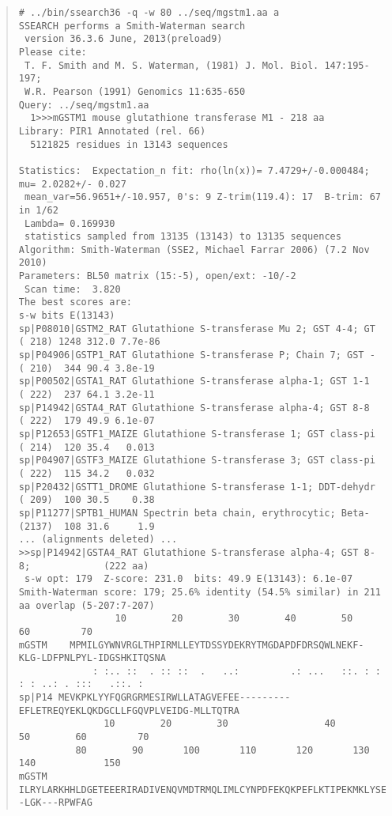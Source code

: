 \begin{footnotesize}
\begin{quote}
\begin{verbatim}
# ../bin/ssearch36 -q -w 80 ../seq/mgstm1.aa a
SSEARCH performs a Smith-Waterman search
 version 36.3.6 June, 2013(preload9)
Please cite:
 T. F. Smith and M. S. Waterman, (1981) J. Mol. Biol. 147:195-197; 
 W.R. Pearson (1991) Genomics 11:635-650
Query: ../seq/mgstm1.aa
  1>>>mGSTM1 mouse glutathione transferase M1 - 218 aa
Library: PIR1 Annotated (rel. 66) 
  5121825 residues in 13143 sequences

Statistics:  Expectation_n fit: rho(ln(x))= 7.4729+/-0.000484; mu= 2.0282+/- 0.027
 mean_var=56.9651+/-10.957, 0's: 9 Z-trim(119.4): 17  B-trim: 67 in 1/62
 Lambda= 0.169930
 statistics sampled from 13135 (13143) to 13135 sequences
Algorithm: Smith-Waterman (SSE2, Michael Farrar 2006) (7.2 Nov 2010)
Parameters: BL50 matrix (15:-5), open/ext: -10/-2
 Scan time:  3.820
The best scores are:                                                    s-w bits E(13143)
sp|P08010|GSTM2_RAT Glutathione S-transferase Mu 2; GST 4-4; GT  ( 218) 1248 312.0 7.7e-86
sp|P04906|GSTP1_RAT Glutathione S-transferase P; Chain 7; GST -  ( 210)  344 90.4 3.8e-19
sp|P00502|GSTA1_RAT Glutathione S-transferase alpha-1; GST 1-1   ( 222)  237 64.1 3.2e-11
sp|P14942|GSTA4_RAT Glutathione S-transferase alpha-4; GST 8-8   ( 222)  179 49.9 6.1e-07
sp|P12653|GSTF1_MAIZE Glutathione S-transferase 1; GST class-pi  ( 214)  120 35.4   0.013
sp|P04907|GSTF3_MAIZE Glutathione S-transferase 3; GST class-pi  ( 222)  115 34.2   0.032
sp|P20432|GSTT1_DROME Glutathione S-transferase 1-1; DDT-dehydr  ( 209)  100 30.5    0.38
sp|P11277|SPTB1_HUMAN Spectrin beta chain, erythrocytic; Beta-   (2137)  108 31.6     1.9
... (alignments deleted) ...
>>sp|P14942|GSTA4_RAT Glutathione S-transferase alpha-4; GST 8-8;             (222 aa)
 s-w opt: 179  Z-score: 231.0  bits: 49.9 E(13143): 6.1e-07
Smith-Waterman score: 179; 25.6% identity (54.5% similar) in 211 aa overlap (5-207:7-207)
                 10        20        30        40        50          60         70     
mGSTM    MPMILGYWNVRGLTHPIRMLLEYTDSSYDEKRYTMGDAPDFDRSQWLNEKF-KLG-LDFPNLPYL-IDGSHKITQSNA
             : :.. ::  . :: ::  .   ..:         .: ...   ::. : : : : ..: . :::   .::. :
sp|P14 MEVKPKLYYFQGRGRMESIRWLLATAGVEFEE---------EFLETREQYEKLQKDGCLLFGQVPLVEIDG-MLLTQTRA
               10        20        30                 40        50        60         70
          80        90       100       110       120       130       140            150
mGSTM  ILRYLARKHHLDGETEEERIRADIVENQVMDTRMQLIMLCYNPDFEKQKPEFLKTIPEKMKLYSEF--LGK---RPWFAG

\end{verbatim}
\end{quote}
\end{footnotesize}
